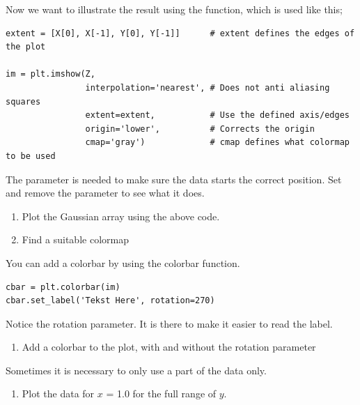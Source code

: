 \documentclass{article}
\begin{document}
Now we want to illustrate the result using the  function, which is used like this;

\begin{lstlisting}
extent = [X[0], X[-1], Y[0], Y[-1]]      # extent defines the edges of the plot

im = plt.imshow(Z,
                interpolation='nearest', # Does not anti aliasing squares
                extent=extent,           # Use the defined axis/edges
                origin='lower',          # Corrects the origin
                cmap='gray')             # cmap defines what colormap to be used
\end{lstlisting}

The  parameter is needed to make sure the data starts the correct position.
Set  and remove the parameter to see what it does.

\begin{enumerate}[resume]

    \item Plot the Gaussian array using the above code.

    \item Find a suitable colormap

\end{enumerate}

You can add a colorbar by using the colorbar function.

\begin{lstlisting}
cbar = plt.colorbar(im)
cbar.set_label('Tekst Here', rotation=270)
\end{lstlisting}

Notice the rotation parameter. It is there to make it easier to read the label.

\begin{enumerate}[resume]

    \item Add a colorbar to the plot, with and without the rotation parameter

\end{enumerate}

Sometimes it is necessary to only use a part of the data only.

\begin{enumerate}[resume]

    \item Plot the data for $x$ = 1.0 for the full range of $y$.

\end{enumerate}


\end{document}
